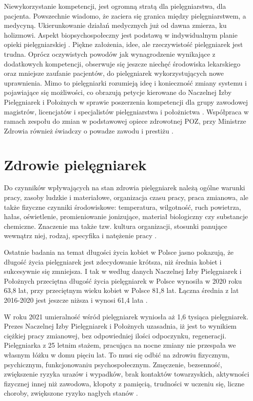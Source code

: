 \documentclass[a4paper,12pt,twoside,openright]{mwrep}
\begin{document}
Niewykorzystanie  kompetencji, jest ogromną stratą dla pielęgniarstwa, dla pacjenta. Powszechnie wiadomo, że zaciera się granica między pielęgniarstwem, a medycyną. Ukierunkowanie działań medycznych już od dawna zmierza, ku holizmowi. Aspekt biopsychospołeczny jest podstawą w indywidualnym planie opieki pielęgniarskiej \cite{dorota}. Piękne założenia, idee, ale rzeczywistość pielęgniarek jest trudna. Oprócz oczywistych powodów jak wynagrodzenie wynikające z dodatkowych kompetencji, obserwuje się jeszcze niechęć środowiska lekarskiego oraz mniejsze zaufanie pacjentów, do pielęgniarek wykorzystujących nowe uprawnienia. Mimo to pielęgniarki rozumieją ideę i konieczność zmiany systemu i  pojawiające się możliwości, co obrazują petycje kierowane do Naczelnej Izby Pielęgniarek i Położnych w sprawie poszerzenia kompetencji dla grupy zawodowej magistrów, licencjatów i specjalistów pielęgniarstwa i położnictwa \cite{petycja}. Współpraca w ramach zespołu do zmian w podstawowej opiece zdrowotnej POZ, przy Ministrze Zdrowia również świadczy o powadze zawodu i prestiżu \cite{poz}.

\section{Zdrowie pielęgniarek}
\label{sectionZdrowiePielegniarek}
Do czynników wpływających na stan zdrowia pielęgniarek należą ogólne warunki pracy, zasoby ludzkie i materiałowe, organizacja czasu pracy,  praca zmianowa, ale także fizyczne czynniki środowiskowe: temperatura, wilgotność, ruch powietrza, hałas, oświetlenie, promieniowanie jonizujące, materiał biologiczny czy substancje chemiczne. Znaczenie ma także tzw. kultura organizacji, stosunki panujące wewnątrz niej, rodzaj, specyfika i natężenie pracy \cite{obciazenia}.

Ostatnie badania na temat długości życia kobiet w Polsce jasno pokazują, że długość życia pielęgniarek jest zdecydowanie krótsza, niż średnia kobiet i sukcesywnie się zmniejsza. I tak w według danych Naczelnej Izby Pielęgniarek i Położnych przeciętna długość życia pielęgniarek w Polsce wynosiła w 2020 roku 63,8 lat, przy przeciętnym wieku kobiet w Polsce 81,8 lat. Łączna średnia z lat 2016-2020 jest jeszcze niższa i wynosi 61,4 lata \cite{statystyka}.

W roku 2021 umieralność wśród pielęgniarek wyniosła aż 1,6 tysiąca pielęgniarek. Prezes Naczelnej Izby Pielęgniarek i Położnych uzasadnia, iż jest to wynikiem ciężkiej pracy zmianowej, bez odpowiedniej ilości odpoczynku, regeneracji. Pielęgniarka z 25 letnim stażem, pracująca na nocne zmiany nie przespała we własnym łóżku w domu pięciu lat. To musi się odbić na zdrowiu fizycznym, psychicznym, funkcjonowaniu psychospołecznym. Zmęczenie, bezsenność, zwiększenie ryzyka urazów i wypadków, brak kontaktów towarzyskich, aktywności fizycznej innej niż zawodowa, kłopoty z pamięcią, trudności w uczeniu się, liczne choroby, zwiększone ryzyko nagłych stanów \cite{zgony}.
\end{document}
